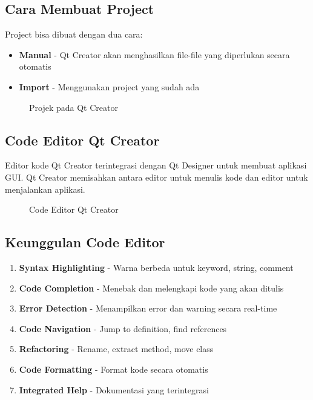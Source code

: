 \subsection{Cara Membuat Project}

Project bisa dibuat dengan dua cara:
\begin{itemize}
\item \textbf{Manual} - Qt Creator akan menghasilkan file-file yang diperlukan secara otomatis
\item \textbf{Import} - Menggunakan project yang sudah ada
\end{itemize}

\begin{figure}[htbp]
\centering
{}
\caption{Projek pada Qt Creator}
\label{fig:projek-pada-qt-creator}
\end{figure}

\subsection{Code Editor Qt Creator}

Editor kode Qt Creator terintegrasi dengan Qt Designer untuk membuat aplikasi GUI. Qt Creator memisahkan antara editor untuk menulis kode dan editor untuk menjalankan aplikasi.

\begin{figure}[htbp]
\centering
{}
\label{fig:code-editor}
\caption{Code Editor Qt Creator}
\end{figure}

\subsection{Keunggulan Code Editor}

\begin{enumerate}
\item \textbf{Syntax Highlighting} - Warna berbeda untuk keyword, string, comment
\item \textbf{Code Completion} - Menebak dan melengkapi kode yang akan ditulis
\item \textbf{Error Detection} - Menampilkan error dan warning secara real-time
\item \textbf{Code Navigation} - Jump to definition, find references
\item \textbf{Refactoring} - Rename, extract method, move class
\item \textbf{Code Formatting} - Format kode secara otomatis
\item \textbf{Integrated Help} - Dokumentasi yang terintegrasi
\end{enumerate}

